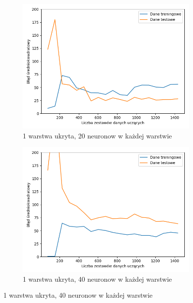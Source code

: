 \documentclass[12pt]{aghdpl}
\begin{document}
		\begin{figure}[h]
			\begin{subfigure}{.5\linewidth}
		 		\includegraphics[width =\linewidth]{wykresy/3_drugi_model_tworzenie_i_analiza/learning_curves.png}
		 		\caption{1 warstwa ukryta, 20 neuronow w każdej warstwie}
		 	\end{subfigure}
		 	\begin{subfigure}{.5\linewidth}
		 		\includegraphics[width =\linewidth]{wykresy/4_zwiekszenie_stopnia_skomplikowania_modelu/1_warstwa_40_neuronow_learning_curves.png}
		 		\caption{1 warstwa ukryta, 40 neuronow w każdej warstwie}
		 	\end{subfigure}
		 	

\end{figure}
\end{document}
